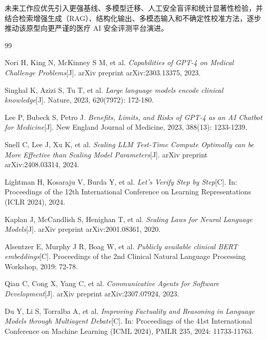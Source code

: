\documentclass[11pt,a4paper]{ctexart}
\begin{document}
未来工作应优先引入更强基线、多模型迁移、人工安全盲评和统计显著性检验，并结合检索增强生成（RAG）、结构化输出、多模态输入和不确定性校准方法，逐步推动该原型向更严谨的医疗 AI 安全评测平台演进。

\newpage
\renewcommand{\refname}{参考文献}
\begin{thebibliography}{99}
\small %

Nori H, King N, McKinney S M, et al.
\emph{Capabilities of GPT-4 on Medical Challenge Problems}[J].
arXiv preprint arXiv:2303.13375, 2023.

Singhal K, Azizi S, Tu T, et al.
\emph{Large language models encode clinical knowledge}[J].
Nature, 2023, 620(7972): 172-180.

Lee P, Bubeck S, Petro J.
\emph{Benefits, Limits, and Risks of GPT-4 as an AI Chatbot for Medicine}[J].
New England Journal of Medicine, 2023, 388(13): 1233-1239.

Snell C, Lee J, Xu K, et al.
\emph{Scaling LLM Test-Time Compute Optimally can be More Effective than Scaling Model Parameters}[J].
arXiv preprint arXiv:2408.03314, 2024.

Lightman H, Kosaraju V, Burda Y, et al.
\emph{Let's Verify Step by Step}[C].
In: Proceedings of the 12th International Conference on Learning Representations (ICLR 2024), 2024.

Kaplan J, McCandlish S, Henighan T, et al.
\emph{Scaling Laws for Neural Language Models}[J].
arXiv preprint arXiv:2001.08361, 2020.

Alsentzer E, Murphy J R, Boag W, et al.
\emph{Publicly available clinical BERT embeddings}[C].
Proceedings of the 2nd Clinical Natural Language Processing Workshop, 2019: 72-78.

Qian C, Cong X, Yang C, et al.
\emph{Communicative Agents for Software Development}[J].
arXiv preprint arXiv:2307.07924, 2023.

Du Y, Li S, Torralba A, et al.
\emph{Improving Factuality and Reasoning in Language Models through Multiagent Debate}[C].
In: Proceedings of the 41st International Conference on Machine Learning (ICML 2024), PMLR 235, 2024: 11733-11763.


\end{thebibliography}
\end{document}
